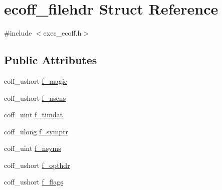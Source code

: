 \hypertarget{structecoff__filehdr}{
\section{ecoff\_\-filehdr Struct Reference}
\label{structecoff__filehdr}
}


{\ttfamily \#include $<$exec\_\-ecoff.h$>$}

\subsection*{Public Attributes}
\begin{DoxyCompactItemize}
\item 
coff\_\-ushort \hyperlink{structecoff__filehdr_ab522e125186b6df344a2bf33f8bb3428}{f\_\-magic}
\item 
coff\_\-ushort \hyperlink{structecoff__filehdr_aa9daf6d29a4caffd5483122cca083c47}{f\_\-nscns}
\item 
coff\_\-uint \hyperlink{structecoff__filehdr_aa5fd02a3c9926125af96c38f41090a7e}{f\_\-timdat}
\item 
coff\_\-ulong \hyperlink{structecoff__filehdr_a2cd3ccadbb8604f38b24b038cf8559c6}{f\_\-symptr}
\item 
coff\_\-uint \hyperlink{structecoff__filehdr_aa43f6c44137652939214788a0060b479}{f\_\-nsyms}
\item 
coff\_\-ushort \hyperlink{structecoff__filehdr_a3caac3fb501a963bfba324a21709ab65}{f\_\-opthdr}
\item 
coff\_\-ushort \hyperlink{structecoff__filehdr_ac623a83f904bd61f81517b5c537178b6}{f\_\-flags}
\end{DoxyCompactItemize}


